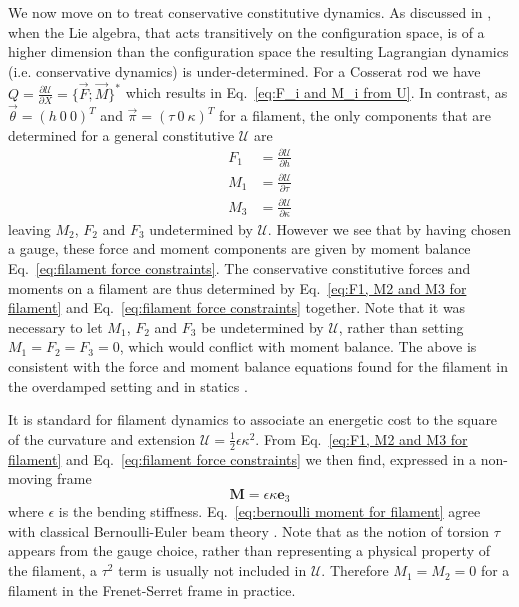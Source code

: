 We now move on to treat conservative constitutive dynamics. As discussed in \citep{levyReviewElieCartan1935}, when the Lie algebra, that acts transitively on the configuration space, is of a higher dimension than the configuration space the resulting Lagrangian dynamics (i.e. conservative dynamics) is under-determined. For a Cosserat rod we have $Q = \frac{\partial \mathcal{U}}{\partial X} = \{ \vec{F} ; \vec{M} \}^*$ which results in Eq.~\ref{eq:F_i and M_i from U}. In contrast, as $\vec{\theta} = (h\ 0\ 0)^T$ and $\vec{\pi} = (\tau\ 0\ \kappa)^T$ for a filament, the only components that are determined for a general constitutive $\mathcal{U}$ are
\begin{subequations} \label{eq:F1, M2 and M3 for filament}
\begin{align}
F_1 & =  \frac{\partial \mathcal{U}}{\partial h} \\
M_1 & =  \frac{\partial \mathcal{U}}{\partial \tau} \\
M_3 & =  \frac{\partial \mathcal{U}}{\partial \kappa} 
\end{align}
\end{subequations}
leaving $M_2$, $F_2$ and $F_3$ undetermined by $\mathcal{U}$. However we see that by having chosen a gauge, these force and moment components are given by moment balance Eq.~\ref{eq:filament force constraints}. The conservative constitutive forces and moments on a filament are thus determined by Eq.~\ref{eq:F1, M2 and M3 for filament} and Eq.~\ref{eq:filament force constraints} together. Note that it was necessary to let $M_1$, $F_2$ and $F_3$ be undetermined by $\mathcal{U}$, rather than setting $M_1 = F_2 = F_3 = 0$, which would conflict with moment balance. The above is consistent with the force and moment balance equations found for the filament in the overdamped setting \citep{powersDynamicsFilamentsMembranes2010} and in statics \citep{parkerDerivationNonlinearRod1984}.

It is standard for filament dynamics to associate an energetic cost to the square of the curvature and extension $\mathcal{U} = \frac{1}{2} \epsilon \kappa^2$.  From Eq.~\ref{eq:F1, M2 and M3 for filament} and Eq.~\ref{eq:filament force constraints} we then find, expressed in a non-moving frame
\begin{equation} \label{eq:bernoulli moment for filament}
\mathbf{M} = \epsilon \kappa \mathbf{e}_3
\end{equation}
where $\epsilon$ is the bending stiffness. Eq.~\ref{eq:bernoulli moment for filament} agree with classical Bernoulli-Euler beam theory \citep{ powersDynamicsFilamentsMembranes2010, sodaDynamicsStiffChains1973, nordgrenComputationMotionElastic1974}. Note that as the notion of torsion $\tau$ appears from the gauge choice, rather than representing a physical property of the filament, a $\tau^2$ term is usually not included in $\mathcal{U}$. Therefore $M_1 = M_2 = 0$ for a filament in the Frenet-Serret frame in practice.

